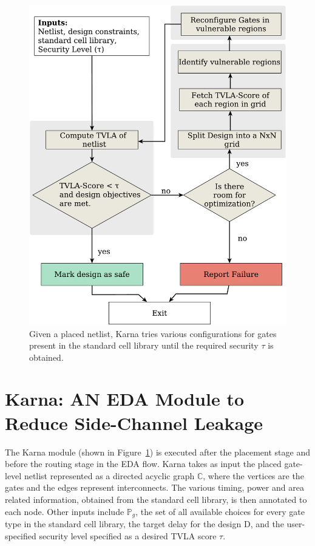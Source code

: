 \begin{figure}[t]
  \includegraphics[scale=0.28]{Chapter4/karnamodule}
  \caption{Given a placed netlist, {\sf Karna} tries various configurations for gates present in the standard cell library until the required security $\tau$ is obtained.}
  \label{fig:proposed}
\end{figure}

\section{{\sf Karna}: AN EDA Module to Reduce Side-Channel Leakage}
\label{sec:proposed}
The {\sf Karna} module (shown in Figure~\ref{fig:proposed}) is executed after the placement stage and before the routing stage in the EDA flow. {\sf Karna} takes as input the placed gate-level netlist represented as a directed acyclic graph $\mathbb C$, where the vertices are the gates and the edges represent interconnects. The various timing, power and area related information, obtained from the standard cell library, is then annotated to each node. Other inputs include $\mathbb P_{g}$, the set of all available choices for every gate type in the standard cell library, the target delay for the design D, and the user-specified security level specified as a desired TVLA score $\tau$.  

